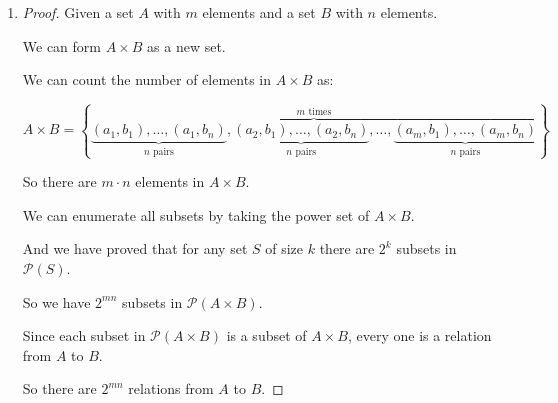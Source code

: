 \documentclass[12pt,letterpaper]{article}
\begin{document}
\begin{enumerate}
\begin{enumerate}
\begin{enumerate}
\begin{proof}
                So Rng($S \circ R$) $\subseteq$ Rng($S$).
              \end{proof}

              A counter example is:

              Let $R = \varnothing, S = \{(a, b)\}$.

              Then $S \circ R = \varnothing$, Rng($S$) = $\{b\}$, Rng($S \circ R$) = $\varnothing$.

              So $\varnothing \subseteq \{b\}$, but $\varnothing \not\supseteq \{b\}$.

              So Rng($S$) $\not\subseteq$ Rng($S \circ R$).
          \end{enumerate}
        \setcounter{enumii}{11}
        \item
          \begin{proof}
            Given a set $A$ with $m$ elements and a set $B$ with $n$ elements.

            We can form $A \times B$ as a new set.

            We can count the number of elements in $A \times B$ as:

            \[A \times B = \left\{\overbrace{\underbrace{(a_1, b_1), \dots, (a_1, b_n)}_{n \text{ pairs}}, \underbrace{(a_2, b_1), \dots, (a_2, b_n)}_{n \text{ pairs}}, \dots, \underbrace{(a_m, b_1), \dots, (a_m, b_n)}_{n \text{ pairs}}}^{m \text{ times}}\right\}\]

            So there are $m \cdot n$ elements in $A \times B$.

            We can enumerate all subsets by taking the power set of $A \times B$.

            And we have proved that for any set $S$ of size $k$ there are $2^k$ subsets in $\mathcal{P}(S)$.

            So we have $2^{mn}$ subsets in $\mathcal{P}(A \times B)$.

            Since each subset in $\mathcal{P}(A \times B)$ is a subset of $A \times B$, every one is a relation from $A$ to $B$.

            So there are $2^{mn}$ relations from $A$ to $B$.
          \end{proof}
      \end{enumerate}
  \end{enumerate}
\end{document}

